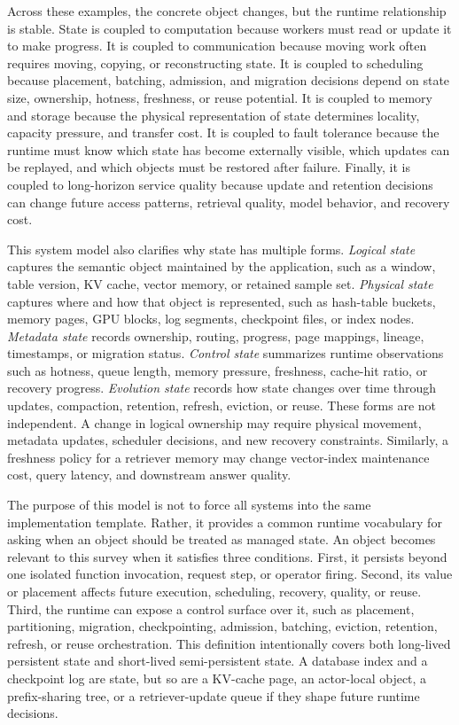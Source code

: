 \documentclass[acmsmall,screen,review]{acmart}
\begin{document}
Across these examples, the concrete object changes, but the runtime relationship is stable. State is coupled to computation because workers must read or update it to make progress. It is coupled to communication because moving work often requires moving, copying, or reconstructing state. It is coupled to scheduling because placement, batching, admission, and migration decisions depend on state size, ownership, hotness, freshness, or reuse potential. It is coupled to memory and storage because the physical representation of state determines locality, capacity pressure, and transfer cost. It is coupled to fault tolerance because the runtime must know which state has become externally visible, which updates can be replayed, and which objects must be restored after failure. Finally, it is coupled to long-horizon service quality because update and retention decisions can change future access patterns, retrieval quality, model behavior, and recovery cost.

This system model also clarifies why state has multiple forms. \emph{Logical state} captures the semantic object maintained by the application, such as a window, table version, KV cache, vector memory, or retained sample set. \emph{Physical state} captures where and how that object is represented, such as hash-table buckets, memory pages, GPU blocks, log segments, checkpoint files, or index nodes. \emph{Metadata state} records ownership, routing, progress, page mappings, lineage, timestamps, or migration status. \emph{Control state} summarizes runtime observations such as hotness, queue length, memory pressure, freshness, cache-hit ratio, or recovery progress. \emph{Evolution state} records how state changes over time through updates, compaction, retention, refresh, eviction, or reuse. These forms are not independent. A change in logical ownership may require physical movement, metadata updates, scheduler decisions, and new recovery constraints. Similarly, a freshness policy for a retriever memory may change vector-index maintenance cost, query latency, and downstream answer quality.

The purpose of this model is not to force all systems into the same implementation template. Rather, it provides a common runtime vocabulary for asking when an object should be treated as managed state. An object becomes relevant to this survey when it satisfies three conditions. First, it persists beyond one isolated function invocation, request step, or operator firing. Second, its value or placement affects future execution, scheduling, recovery, quality, or reuse. Third, the runtime can expose a control surface over it, such as placement, partitioning, migration, checkpointing, admission, batching, eviction, retention, refresh, or reuse orchestration. This definition intentionally covers both long-lived persistent state and short-lived semi-persistent state. A database index and a checkpoint log are state, but so are a KV-cache page, an actor-local object, a prefix-sharing tree, or a retriever-update queue if they shape future runtime decisions.
\end{document}
